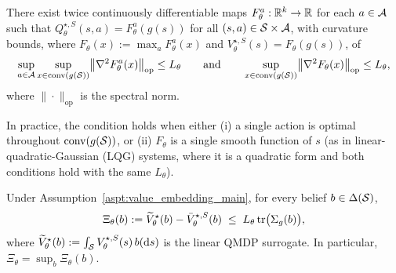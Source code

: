 \begin{aspt}\label{aspt:value_embedding_main}
There exist twice continuously differentiable maps $F_\theta^a:{\mathbb{R}}^k\to{\mathbb{R}}$ for each $a\in{\mathcal{A}}$ such that
$Q_\theta^{\star,S}(s,a)=F_\theta^a(g(s))$ for all $(s,a)\in{\mathcal{S}}\times{\mathcal{A}}$, with curvature bounds, where $F_\theta(x):=\max_a F_\theta^a(x)$ and $V_\theta^{\star,S}(s)=F_\theta(g(s))$, of
\[
\sup_{a\in{\mathcal{A}}}\sup_{x\in\mathrm{conv}(g({\mathcal{S}}))}\bigl\|\nabla^2 F_\theta^a(x)\bigr\|_{\mathrm{op}}\le L_\theta
\qquad\text{and}\qquad
\sup_{x\in\mathrm{conv}(g({\mathcal{S}}))}\bigl\|\nabla^2 F_\theta(x)\bigr\|_{\mathrm{op}}\le L_\theta
,\]
where $\|\cdot\|_{\mathrm{op}}$ is the spectral norm.
\end{aspt}
In practice, the condition holds when either (i) a single action is optimal throughout $\mathrm{conv}(g({\mathcal{S}}))$, or (ii) $F_\theta$ is a single smooth function of $s$ (as in linear-quadratic-Gaussian (LQG) systems, where it is a quadratic form and both conditions hold with the same $L_\theta$).

\begin{prop}\label{prop:variance_qmdp_bias_main}
Under Assumption~\ref{aspt:value_embedding_main}, for every belief $b\in\Delta({\mathcal{S}})$,
\begin{equation}
\Xi_\theta(b)
:=\widetilde V_\theta^{\star}(b)-\bar V_\theta^{\star,S}(b) 
\;\le\;
L_\theta\,\textnormal{tr}\bigl(\Sigma_g(b)\bigr), 
\label{eq:variance_xi_bound_main}
\end{equation}
where $\widetilde V_\theta^{\star}(b):=\int_{{\mathcal{S}}}V_\theta^{\star,S}(s)\,b(\mathrm ds)$ is the linear QMDP surrogate.
In particular, $\Xi_\theta=\sup_b\Xi_\theta(b)$.
\end{prop}

